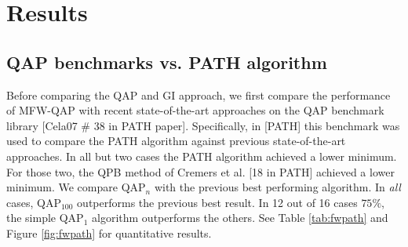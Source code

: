 \documentclass{article} %
\begin{document}


\section{Results}

\subsection{QAP benchmarks vs. PATH algorithm}

Before comparing the QAP and GI approach, we first compare the performance of MFW-QAP with recent state-of-the-art approaches on the QAP benchmark library [Cela07 \# 38 in PATH paper].  Specifically, in [PATH] this benchmark was used to compare the PATH algorithm against previous state-of-the-art approaches.  In all but two cases the PATH algorithm achieved a lower minimum.  For those two, the QPB method of Cremers et al. [18 in PATH] achieved a lower minimum.  We compare QAP$_n$ with the previous best performing algorithm.  In \emph{all} cases, QAP$_100$ outperforms the previous best result.  In 12 out of 16 cases $75\%$, the simple QAP$_1$ algorithm outperforms the others.  See Table \ref{tab:fwpath} and Figure \ref{fig:fwpath} for quantitative results.
\end{document}

